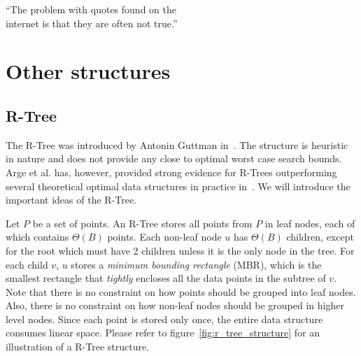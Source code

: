 \documentclass[twoside,11pt,openright]{report}
\begin{document}
\begin{savequote}[0.5\textwidth]
``The problem with quotes found on the\\internet is that they are often not true.''
\end{savequote}
\chapter{Other structures}
\label{chp:other_structures}
\section{R-Tree}

The R-Tree was introduced by Antonin Guttman in~\cite{Guttman:1984:RDI:602259.602266}. The structure is heuristic in nature and does not provide any close to optimal worst case search bounds. Arge et al. has, however, provided strong evidence for R-Trees outperforming several theoretical optimal data structures in practice in~\cite{Arge:2008:PRP:1328911.1328920}. We will introduce the important ideas of the R-Tree.

Let $P$ be a set of points. An R-Tree stores all points from $P$ in leaf nodes, each of which contains $\Theta(B)$ points. Each non-leaf node $u$ has $\Theta(B)$ children, except for the root which must have 2 children unless it is the only node in the tree. For each child $v$, $u$ stores a \textit{minimum bounding rectangle} (MBR), which is the smallest rectangle that \textit{tightly} encloses all the data points in the subtree of $v$. Note that there is no constraint on how points should be grouped into leaf nodes. Also, there is no constraint on how non-leaf nodes should be grouped in higher level nodes. Since each point is stored only once, the entire data structure consumes linear space. Please refer to figure~\ref{fig:r_tree_structure} for an illustration of a R-Tree structure.
\end{document}

